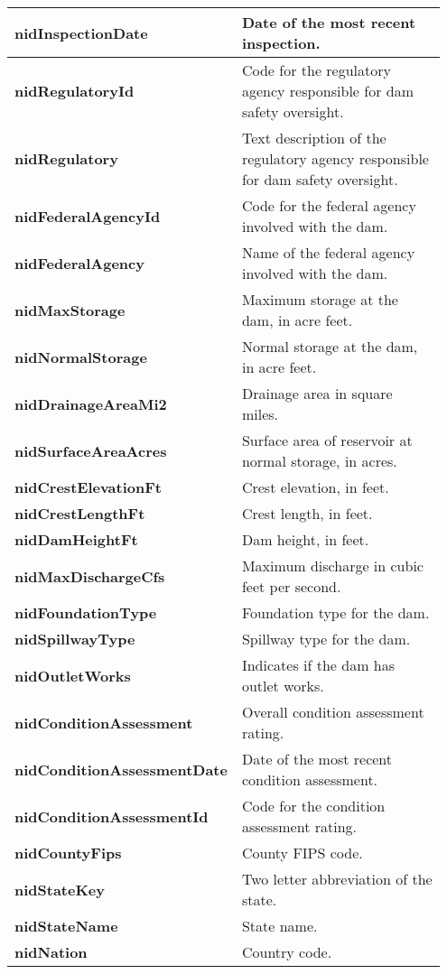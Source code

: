 \documentclass{article}
\begin{document}
\begin{longtable}{p{0.35\linewidth} p{0.6\linewidth}}
\textbf{nidInspectionDate} & Date of the most recent inspection. \\\hline
\textbf{nidRegulatoryId} & Code for the regulatory agency responsible for dam safety oversight. \\\hline
\textbf{nidRegulatory} & Text description of the regulatory agency responsible for dam safety oversight. \\\hline
\textbf{nidFederalAgencyId} & Code for the federal agency involved with the dam. \\\hline
\textbf{nidFederalAgency} & Name of the federal agency involved with the dam. \\\hline
\textbf{nidMaxStorage} & Maximum storage at the dam, in acre feet. \\\hline
\textbf{nidNormalStorage} & Normal storage at the dam, in acre feet. \\\hline
\textbf{nidDrainageAreaMi2} & Drainage area in square miles. \\\hline
\textbf{nidSurfaceAreaAcres} & Surface area of reservoir at normal storage, in acres. \\\hline
\textbf{nidCrestElevationFt} & Crest elevation, in feet. \\\hline
\textbf{nidCrestLengthFt} & Crest length, in feet. \\\hline
\textbf{nidDamHeightFt} & Dam height, in feet. \\\hline
\textbf{nidMaxDischargeCfs} & Maximum discharge in cubic feet per second. \\\hline
\textbf{nidFoundationType} & Foundation type for the dam. \\\hline
\textbf{nidSpillwayType} & Spillway type for the dam. \\\hline
\textbf{nidOutletWorks} & Indicates if the dam has outlet works. \\\hline
\textbf{nidConditionAssessment} & Overall condition assessment rating. \\\hline
\textbf{nidConditionAssessmentDate} & Date of the most recent condition assessment. \\\hline
\textbf{nidConditionAssessmentId} & Code for the condition assessment rating. \\\hline
\textbf{nidCountyFips} & County FIPS code. \\\hline
\textbf{nidStateKey} & Two letter abbreviation of the state. \\\hline
\textbf{nidStateName} & State name. \\\hline
\textbf{nidNation} & Country code. \\\hline

\end{longtable}
\end{document}
